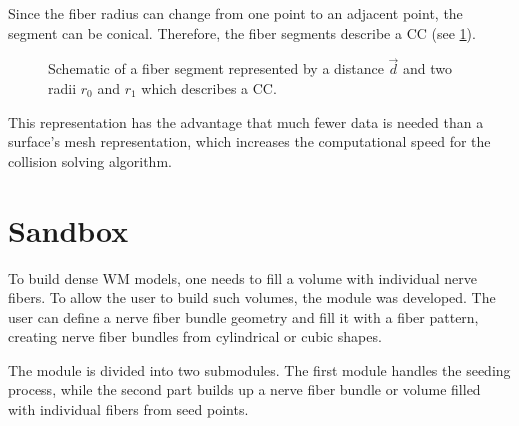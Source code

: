 %
Since the fiber radius can change from one point to an adjacent point, the segment can be conical.
Therefore, the fiber segments describe a \ac{CC} (see \cref{fig:conical}).
\par
%
\begin{figure}[!t]
    \centering
    \setlength{\tikzwidth}{0.5\textwidth}
	\caption[]{Schematic of a fiber segment represented by a distance $\vec{d}$ and two radii $r_0$ and $r_1$ which describes a  \ac{CC}.}
	\label{fig:conical}
\end{figure}
%
This representation has the advantage that much fewer data is needed than a surface's mesh representation, which increases the computational speed for the collision solving algorithm.
%
%
%
\section{Sandbox}\label{sec:sandbox}
%
To build dense \ac{WM} models, one needs to fill a volume with individual nerve fibers.
To allow the user to build such volumes, the module  was developed.
The user can define a nerve fiber bundle geometry and fill it with a fiber pattern, creating nerve fiber bundles from cylindrical or cubic shapes.
\par
%
The module  is divided into two submodules.
The first module handles the seeding process, while the second part builds up a nerve fiber bundle or volume filled with individual fibers from seed points.
%
%
%
